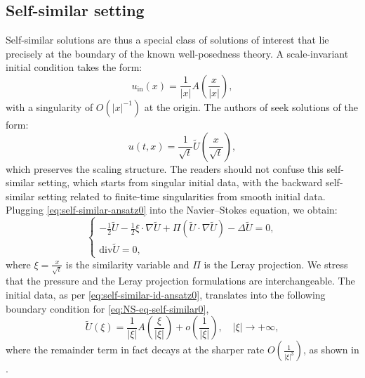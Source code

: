\documentclass[11pt,a4paper]{article}
\numberwithin{equation}{section}
\newcommand{\cdummy}{\cdot}
\newcommand{\tmop}[1]{\ensuremath{\operatorname{#1}}}
\begin{document}
\subsection{Self-similar setting} \label{sec:ss}
Self-similar solutions are thus a special class of solutions of interest that lie precisely at
the boundary of the known well-posedness theory.  A scale-invariant initial condition takes the form:
\begin{equation}
  u_{\tmop{in}} (x) = \frac{1}{| x |} A ( \frac{x}{| x |} ) ,
  \label{eq:self-similar-id-ansatz0}
\end{equation}
with a singularity of $O (| x |^{- 1})$ at the origin.
The authors of {\cite{jia2014local,jia2015incompressible}} seek
solutions of the form:
\begin{equation}
  u (t, x) = \frac{1}{\sqrt{t}} \widetilde{U} ( \frac{x}{\sqrt{t}} ) ,
  \label{eq:self-similar-ansatz0}
\end{equation}
which preserves the scaling structure.  The readers should not confuse this self-similar setting, which starts from singular initial data, with the backward self-similar setting related to finite-time singularities from smooth initial data. Plugging \eqref{eq:self-similar-ansatz0} into the Navier--Stokes equation, we obtain:
\begin{equation}
  \left\{\begin{array}{l}
    - \frac{1}{2}  \widetilde{U} - \frac{1}{2} \xi \cdummy \nabla \widetilde{U} + \Pi
    (\widetilde{U} \cdot \nabla \widetilde{U}) - \Delta \widetilde{U} = 0,\\
    \mathrm{div}  \widetilde{U} = 0,
  \end{array}\right. \label{eq:NS-eq-self-similar0}
\end{equation}
where $\xi = \frac{x}{\sqrt{t}}$ is the similarity variable and $\Pi$ is the Leray projection. We stress that the pressure and the Leray projection formulations are interchangeable. The initial
data, as per  \eqref{eq:self-similar-id-ansatz0}, translates into
the following boundary condition for \eqref{eq:NS-eq-self-similar0}, 
\begin{equation}
    \label{boundary u0}\widetilde{U} (\xi) = \frac{1}{| \xi |} A ( \frac{\xi}{| \xi |} ) +
   o ( \frac{1}{| \xi |} ), \quad| \xi | \to + \infty,
\end{equation} 
where the remainder term in fact decays at the sharper rate $O( \frac{1}{| \xi |^3} )$, as shown in \cite{jia2014local}.
\end{document}

